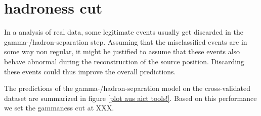 \section{hadroness cut}

In a analysis of real data, some legitimate events usually get discarded
in the gamma-/hadron-separation step.
Assuming that the misclassified events are in some way non regular, it might be 
justified to assume that these events also behave abnormal during the reconstruction of 
the source position. Discarding these events could thus improve the overall 
predictions.

The predictions of the gamma-/hadron-separation model on the cross-validated dataset
are summarized in figure \ref{plot aus aict tools!}.
Based on this performance we set the gammaness cut at XXX.



